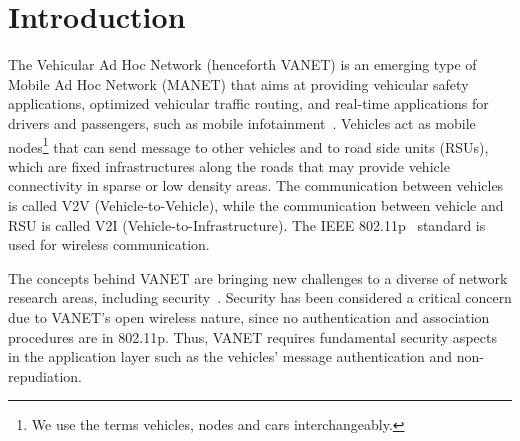 \documentclass[preprint,12pt]{elsarticle}
\begin{document}
\section{Introduction}

The Vehicular Ad Hoc Network (henceforth VANET) is an emerging type of Mobile Ad Hoc Network (MANET) that aims at providing vehicular safety applications, optimized vehicular traffic routing, and real-time applications for drivers and passengers, such as mobile infotainment~\cite{al2013comprehensive}. Vehicles act as mobile nodes\footnote{We use the terms vehicles, nodes and cars interchangeably.} that can send message to other vehicles and to road side units (RSUs), which are fixed infrastructures along the roads that may provide vehicle connectivity in sparse or low density areas. The communication between vehicles is called V2V (Vehicle-to-Vehicle), while the communication between vehicle and RSU is called V2I (Vehicle-to-Infrastructure). The IEEE 802.11p~\cite{ieee11802} standard is used for wireless communication.


The concepts behind VANET are bringing new challenges to a diverse of network research areas, including security~\cite{gillani2013survey}. Security has been considered a critical concern due to VANET's open wireless nature, since no authentication and association procedures are in 802.11p. Thus, VANET requires fundamental security aspects in the application layer such as the vehicles' message authentication and non-repudiation.

\end{document}
